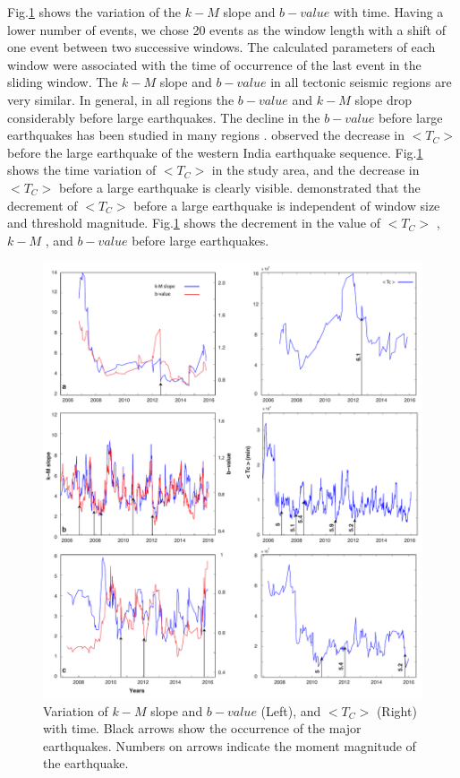 \noindent
Fig.\ref{fig:tc} shows the variation of the  $k-M$  slope and  $b-value$  with time. Having a lower number of events, we chose 20 events as the window length with a shift of one event between two successive windows. The calculated parameters of each window were associated with the time of occurrence of the last event in the sliding window. The  $k-M$  slope and  $b-value$  in all tectonic seismic regions are very similar. In general, in all regions the $b-value$  and  $k-M$  slope drop considerably before large earthquakes. The decline in the  $b-value$  before large earthquakes has been studied in many regions \citep{Wyss2000, Wyss2006, Schorlemmer2005, Chan2012}.
\noindent
\citet{Telesca2016}  observed the decrease in  $<T_C>$  before the large earthquake of the western India earthquake sequence. Fig.\ref{fig:tc}  shows the time variation of  $<T_C>$   in the study area, and the decrease in  $<T_C>$   before a large earthquake is clearly visible.  \citet{Telesca2016}  demonstrated that the decrement of  $<T_C>$   before a large earthquake is independent of window size and threshold magnitude. Fig.\ref{fig:tc}  shows the decrement in the value of  $<T_C>$  ,  $k-M$ , and  $b-value$  before large earthquakes.
 
  
 \begin{figure} [ht]
\centering
\includegraphics[scale=0.34]{figures/pdf/Figure08.pdf} 
\caption{ Variation of $k-M$ slope  and $b-value$ (Left), and $ < T_C >$ (Right) with time. Black arrows show the occurrence of the major earthquakes. Numbers on arrows indicate the moment magnitude of the earthquake.}
\label{fig:tc}
\end{figure}
 

